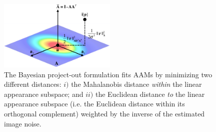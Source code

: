 \begin{figure}
    \centering
    \includegraphics[width=0.50\textwidth]{figures/bayes.png}
    \caption{The Bayesian project-out formulation fits AAMs by minimizing two different distances: $i)$ the Mahalanobis distance \emph{within} the linear appearance subspace; and $ii)$ the Euclidean distance \emph{to} the linear appearance subspace (i.e. the Euclidean distance within its orthogonal complement) weighted by the inverse of the estimated image noise.}
    \label{fig:bayes}
\end{figure}
